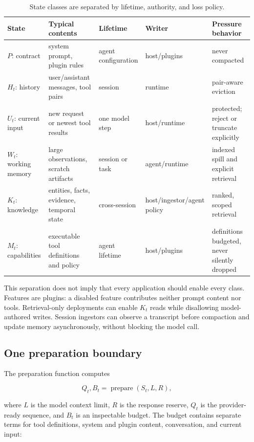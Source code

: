 \documentclass[sigplan,10pt,anonymous,review]{acmart}
\begin{document}
\begin{table}[t]
\caption{State classes are separated by lifetime, authority, and loss policy.}
\label{tab:state}
\centering
\small
\begin{tabular}{lllll}
\toprule
State & Typical contents & Lifetime & Writer & Pressure behavior \\
\midrule
$P$: contract & system prompt, plugin rules & agent configuration & host/plugins & never compacted \\
$H_t$: history & user/assistant messages, tool pairs & session & runtime & pair-aware eviction \\
$U_t$: current input & new request or newest tool results & one model step & host/runtime & protected; reject or truncate explicitly \\
$W_t$: working memory & large observations, scratch artifacts & session or task & agent/runtime & indexed spill and explicit retrieval \\
$K_t$: knowledge & entities, facts, evidence, temporal state & cross-session & host/ingestor/agent policy & ranked, scoped retrieval \\
$M_t$: capabilities & executable tool definitions and policy & agent lifetime & host/plugins & definitions budgeted, never silently dropped \\
\bottomrule
\end{tabular}
\end{table}

This separation does not imply that every application should enable every
class.  Features are plugins: a disabled feature contributes neither prompt
content nor tools.  Retrieval-only deployments can enable $K_t$ reads while
disallowing model-authored writes.  Session ingestors can observe a transcript
before compaction and update memory asynchronously, without blocking the model
call.

\subsection{One preparation boundary}

The preparation function computes

\begin{equation}
Q_t, B_t = \operatorname{prepare}(S_t, L, R),
\end{equation}

where $L$ is the model context limit, $R$ is the response reserve, $Q_t$ is the
provider-ready sequence, and $B_t$ is an inspectable budget.  The budget
contains separate terms for tool definitions, system and plugin content,
conversation, and current input:
\end{document}
